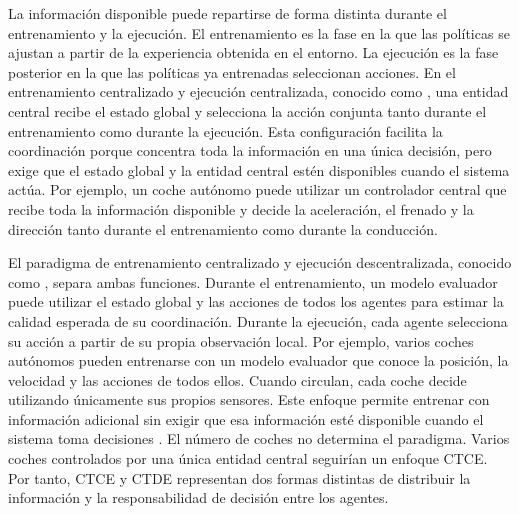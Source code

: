 La información disponible puede repartirse de forma distinta durante el entrenamiento y la ejecución. El entrenamiento es la fase en la que las políticas se ajustan a partir de la experiencia obtenida en el entorno. La ejecución es la fase posterior en la que las políticas ya entrenadas seleccionan acciones. En el entrenamiento centralizado y ejecución centralizada, conocido como , una entidad central recibe el estado global y selecciona la acción conjunta tanto durante el entrenamiento como durante la ejecución. Esta configuración facilita la coordinación porque concentra toda la información en una única decisión, pero exige que el estado global y la entidad central estén disponibles cuando el sistema actúa. Por ejemplo, un coche autónomo puede utilizar un controlador central que recibe toda la información disponible y decide la aceleración, el frenado y la dirección tanto durante el entrenamiento como durante la conducción.

El paradigma de entrenamiento centralizado y ejecución descentralizada, conocido como , separa ambas funciones. Durante el entrenamiento, un modelo evaluador puede utilizar el estado global y las acciones de todos los agentes para estimar la calidad esperada de su coordinación. Durante la ejecución, cada agente selecciona su acción a partir de su propia observación local. Por ejemplo, varios coches autónomos pueden entrenarse con un modelo evaluador que conoce la posición, la velocidad y las acciones de todos ellos. Cuando circulan, cada coche decide utilizando únicamente sus propios sensores. Este enfoque permite entrenar con información adicional sin exigir que esa información esté disponible cuando el sistema toma decisiones \cite{lowe2017maddpg,yu2022mappo}. El número de coches no determina el paradigma. Varios coches controlados por una única entidad central seguirían un enfoque CTCE. Por tanto, CTCE y CTDE representan dos formas distintas de distribuir la información y la responsabilidad de decisión entre los agentes.

